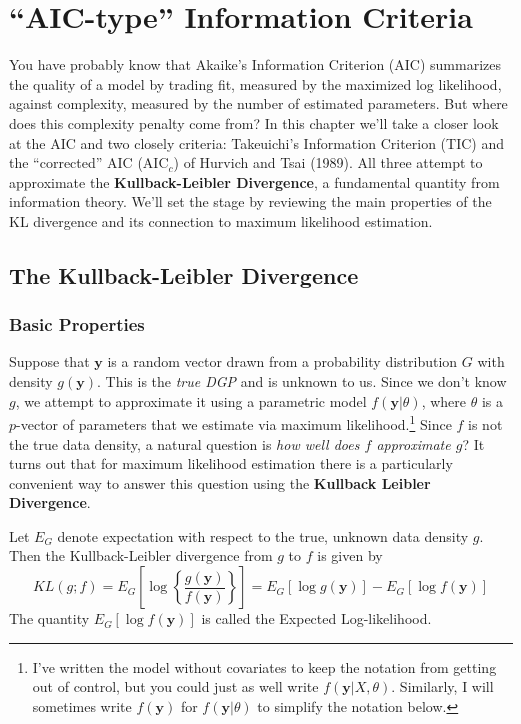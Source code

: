 \chapter{``AIC-type'' Information Criteria}
You have probably know that Akaike's Information Criterion (AIC) summarizes the quality of a model by trading fit, measured by the maximized log likelihood, against complexity, measured by the number of estimated parameters.
But where does this complexity penalty come from?
In this chapter we'll take a closer look at the AIC and two closely criteria: Takeuichi's Information Criterion (TIC) and the ``corrected'' AIC (AIC$_c$) of Hurvich and Tsai (1989).
All three attempt to approximate the \textbf{Kullback-Leibler Divergence}, a fundamental quantity from information theory.
We'll set the stage by reviewing the main properties of the KL divergence and its connection to maximum likelihood estimation.


\section{The Kullback-Leibler Divergence}

\subsection{Basic Properties}
Suppose that $\mathbf{y}$ is a random vector drawn from a probability distribution $G$ with density $g(\mathbf{y})$. This is the \emph{true DGP} and is unknown to us. Since we don't know $g$, we attempt to approximate it using a parametric model $f(\mathbf{y}|\theta)$, where $\theta$ is a $p$-vector of parameters that we estimate via maximum likelihood.\footnote{I've written the model without covariates to keep the notation from getting out of control, but you could just as well write $f(\mathbf{y}|X,\theta)$. Similarly, I will sometimes write $f(\mathbf{y})$ for $f(\mathbf{y}|\theta)$ to simplify the notation below. } Since $f$ is not the true data density, a natural question is \emph{how well does $f$ approximate $g$}? It turns out that for maximum likelihood estimation there is a particularly convenient way to answer this question using the \textbf{Kullback Leibler Divergence}.


\begin{defn}[KL Divergence]
Let $E_G$ denote expectation with respect to the true, unknown data density $g$. Then the Kullback-Leibler divergence from $g$ to $f$ is given by
$$KL(g;f) = E_G \left[ \log{\left\{\frac{g(\textbf{y})}{f(\textbf{y})}\right\}}\right]= E_G\left[ \log{g(\textbf{y})}\right] - E_G\left[ \log{f(\textbf{y})} \right]$$
The quantity $E_G\left[ \log{f(\mathbf{y})} \right]$ is called the Expected Log-likelihood.
\end{defn}

